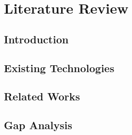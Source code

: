 \section{Literature Review}
\label{sec:review}
\subsection{Introduction}

\subsection{Existing Technologies}
\subsection{Related Works}
\subsection{Gap Analysis}
